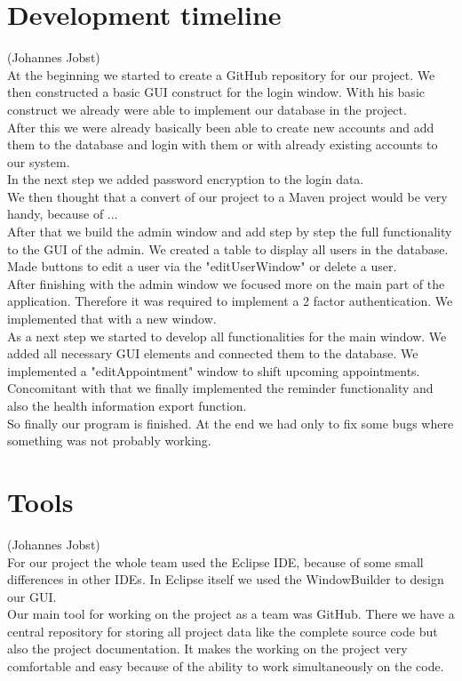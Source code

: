 \documentclass[a4paper, 12pt]{report}
\begin{document}
\section{Development timeline}
{\tiny (Johannes Jobst)\\}
At the beginning we started to create a GitHub repository for our project. We then constructed a basic GUI construct for the login window. With his basic construct we already were able to implement our database in the project. \\
After this we were already basically been able to create new accounts and add them to the database and login with them or with already existing accounts to our system. \\
In the next step we added password encryption to the login data. \\
We then thought that a convert of our project to a Maven project would be very handy, because of ... %
\\
After that we build the admin window and add step by step the full functionality to the GUI of the admin. We created a table to display all users in the database. Made buttons to edit a user via the "editUserWindow" or delete a user.
\\
After finishing with the admin window we focused more on the main part of the application. Therefore it was required to implement a 2 factor authentication. We implemented that with a new window.
\\
As a next step we started to develop all functionalities for the main window. We added all necessary GUI elements and connected them to the database. We implemented a "editAppointment" window to shift upcoming appointments. Concomitant with that we finally implemented the reminder functionality and also the health information export function.
\\
So finally our program is finished. At the end we had only to fix some bugs where something was not probably working. 

\section{Tools}
{\tiny (Johannes Jobst)\\}
For our project the whole team used the Eclipse IDE, because of some small differences in other IDEs. In Eclipse itself we used the WindowBuilder to design our GUI.\\
Our main tool for working on the project as a team was GitHub. There we have a central repository for storing all project data like the complete source code but also the project documentation. It makes the working on the project very comfortable and easy because of the ability to work simultaneously on the code.
\end{document}
